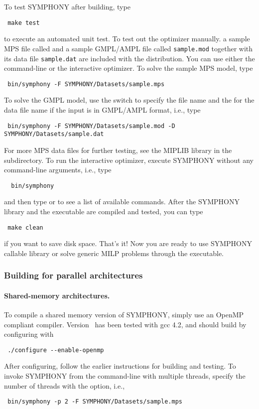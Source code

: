 To test SYMPHONY after building, type
{\color{Brown}
\begin{verbatim}
 make test
\end{verbatim}
} to execute an automated unit test. To test out the optimizer manually. a
sample MPS file called  and a sample GMPL/AMPL file called
{\color{Brown}\texttt{sample.mod}} together with its data file
{\color{Brown}\texttt{sample.dat}} are included with the distribution. You can
use either the command-line or the interactive optimizer. To solve the sample
MPS model, type {\color{Brown}
\begin{verbatim}
 bin/symphony -F SYMPHONY/Datasets/sample.mps
\end{verbatim}
} To solve the GMPL model, use the  switch to specify the file name
and the  for the data file name if the input is in GMPL/AMPL format,
i.e., type 
{\color{Brown}
\begin{verbatim}
 bin/symphony -F SYMPHONY/Datasets/sample.mod -D SYMPHONY/Datasets/sample.dat
\end{verbatim}}
For more MPS data files for further testing, see the MIPLIB library in the
 subdirectory. To run the interactive optimizer, execute SYMPHONY
without any command-line arguments, i.e., type
{\color{Brown}
\begin{verbatim}
  bin/symphony 
\end{verbatim}}
and then type  or  to see a list of available commands.
After the SYMPHONY library and the executable are compiled and tested, you
can type
{\color{Brown}
\begin{verbatim}
 make clean 
\end{verbatim}}
if you want to save disk space. That's it! Now you are ready to use SYMPHONY
callable library or solve generic MILP problems through the executable.

\subsubsection{Building for parallel architectures}

\paragraph{Shared-memory architectures.}

To compile a shared memory version of SYMPHONY, simply use an OpenMP compliant
compiler. Version \VER\  has been tested with gcc 4.2, and should build by
configuring with
{\color{Brown}
\begin{verbatim}
 ./configure --enable-openmp
\end{verbatim}
} 
After configuring, follow the earlier instructions for building and testing.
To invoke SYMPHONY from the command-line with multiple threads, specify the
number of threads with the  option, i.e., {\color{Brown}
\begin{verbatim}
 bin/symphony -p 2 -F SYMPHONY/Datasets/sample.mps
\end{verbatim}
}

